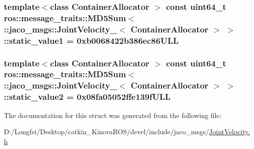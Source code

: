 \subsubsection[{\texorpdfstring{static\+\_\+value1}{static_value1}}]{\setlength{\rightskip}{0pt plus 5cm}template$<$class Container\+Allocator $>$ const uint64\+\_\+t ros\+::message\+\_\+traits\+::\+M\+D5\+Sum$<$ \+::{\bf jaco\+\_\+msgs\+::\+Joint\+Velocity\+\_\+}$<$ Container\+Allocator $>$ $>$\+::static\+\_\+value1 = 0xb0068422b386ec86\+U\+LL\hspace{0.3cm}{\ttfamily [static]}}\hypertarget{structros_1_1message__traits_1_1MD5Sum_3_01_1_1jaco__msgs_1_1JointVelocity___3_01ContainerAllocator_01_4_01_4_a0709a64a1a6641970610b55bed41cc69}{}\label{structros_1_1message__traits_1_1MD5Sum_3_01_1_1jaco__msgs_1_1JointVelocity___3_01ContainerAllocator_01_4_01_4_a0709a64a1a6641970610b55bed41cc69}
\subsubsection[{\texorpdfstring{static\+\_\+value2}{static_value2}}]{\setlength{\rightskip}{0pt plus 5cm}template$<$class Container\+Allocator $>$ const uint64\+\_\+t ros\+::message\+\_\+traits\+::\+M\+D5\+Sum$<$ \+::{\bf jaco\+\_\+msgs\+::\+Joint\+Velocity\+\_\+}$<$ Container\+Allocator $>$ $>$\+::static\+\_\+value2 = 0x08fa05052ffe139f\+U\+LL\hspace{0.3cm}{\ttfamily [static]}}\hypertarget{structros_1_1message__traits_1_1MD5Sum_3_01_1_1jaco__msgs_1_1JointVelocity___3_01ContainerAllocator_01_4_01_4_ab3ec3ceccf2f3596cf29c9221bf32c72}{}\label{structros_1_1message__traits_1_1MD5Sum_3_01_1_1jaco__msgs_1_1JointVelocity___3_01ContainerAllocator_01_4_01_4_ab3ec3ceccf2f3596cf29c9221bf32c72}


The documentation for this struct was generated from the following file\+:\begin{DoxyCompactItemize}
\item 
D\+:/\+Longfei/\+Desktop/catkin\+\_\+\+Kinova\+R\+O\+S/devel/include/jaco\+\_\+msgs/\hyperlink{JointVelocity_8h}{Joint\+Velocity.\+h}\end{DoxyCompactItemize}
